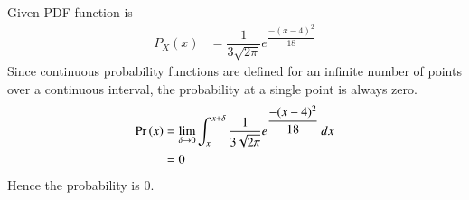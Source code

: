 Given PDF function is
\begin{align}
  P_{X}(x) &= \dfrac{1}{3\sqrt{2\pi}}e^{\dfrac{-(x-4)^{2}}{18}}
\end{align}
Since continuous probability functions are defined for an infinite number of points over a continuous interval, the probability at a single point is always zero.
\begin{align}
    \Pr\left(x\right) &=  \lim_{\delta\to 0} \int_{x}^{x+\delta} \dfrac{1}{3\sqrt{2\pi}}e^{\dfrac{-(x-4)^{2}}{18}} \,dx\\
    &=0
\end{align}
Hence the probability is 0.